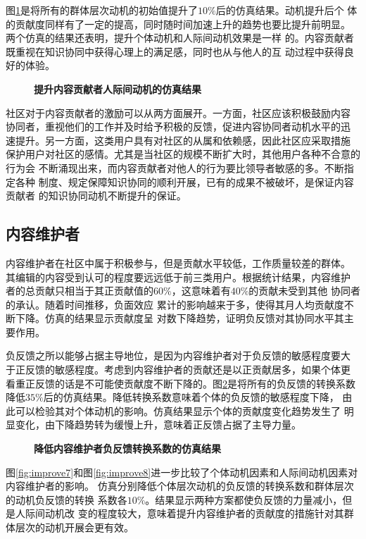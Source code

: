 图\ref{fig:improve6}是将所有的群体层次动机的初始值提升了$10\%$后的仿真结果。动机提升后个
体的贡献度同样有了一定的提高，同时随时间加速上升的趋势也要比提升前明显。
两个仿真的结果还表明，提升个体动机和人际间动机效果是一样
的。内容贡献者既重视在知识协同中获得心理上的满足感，同时也从与他人的互
动过程中获得良好的体验。

\begin{figure}[!htb]
  \centering
  
  \caption{\small{\textbf{提升内容贡献者人际间动机的仿真结果}}}
  \label{fig:improve6}
\end{figure}

社区对于内容贡献者的激励可以从两方面展开。一方面，社区应该积极鼓励内容
协同者，重视他们的工作并及时给予积极的反馈，促进内容协同者动机水平的迅
速提升。另一方面，这类用户具有对社区的从属和依赖感，因此社区应采取措施
保护用户对社区的感情。尤其是当社区的规模不断扩大时，其他用户各种不合意的行为会
不断涌现出来，而内容贡献者对他人的行为要比领导者敏感的多。不断指定各种
制度、规定保障知识协同的顺利开展，已有的成果不被破坏，是保证内容贡献者
的知识协同动机不断提升的保证。

\subsection{内容维护者}
内容维护者在社区中属于积极参与，但是贡献水平较低，工作质量较差的群体。
其编辑的内容受到认可的程度要远远低于前三类用户。根据统计结果，内容维护
者的总贡献只相当于其正贡献值的$60\%$，这意味着有$40\%$的贡献未受到其他
协同者的承认。随着时间推移，负面效应
累计的影响越来于多，使得其月人均贡献度不断下降。仿真的结果显示贡献度呈
对数下降趋势，证明负反馈对其协同水平其主要作用。

负反馈之所以能够占据主导地位，是因为内容维护者对于负反馈的敏感程度要大
于正反馈的敏感程度。考虑到内容维护者的贡献还是以正贡献居多，如果个体更
看重正反馈的话是不可能使贡献度不断下降的。图\ref{fig:improveX}是将所有的负反馈的转换系数
降低$35\%$后的仿真结果。降低转换系数意味着个体的负反馈的敏感程度下降，
由此可以检验其对个体动机的影响。仿真结果显示个体的贡献度变化趋势发生了
明显变化，由下降趋势转为缓慢上升，意味着正反馈占据了主导力量。

\begin{figure}[!htb]
  \centering
   
  \caption{\small{\textbf{降低内容维护者负反馈转换系数的仿真结果}}}
  \label{fig:improveX}
\end{figure}

图\ref{fig:improve7}和图\ref{fig:improve8}进一步比较了个体动机因素和人际间动机因素对内容维护者的影响。
仿真分别降低个体层次动机的负反馈的转换系数和群体层次的动机负反馈的转换
系数各$10\%$。结果显示两种方案都使负反馈的力量减小，但是人际间动机改
变的程度较大，意味着提升内容维护者的贡献度的措施针对其群体层次的动机开展会更有效。

